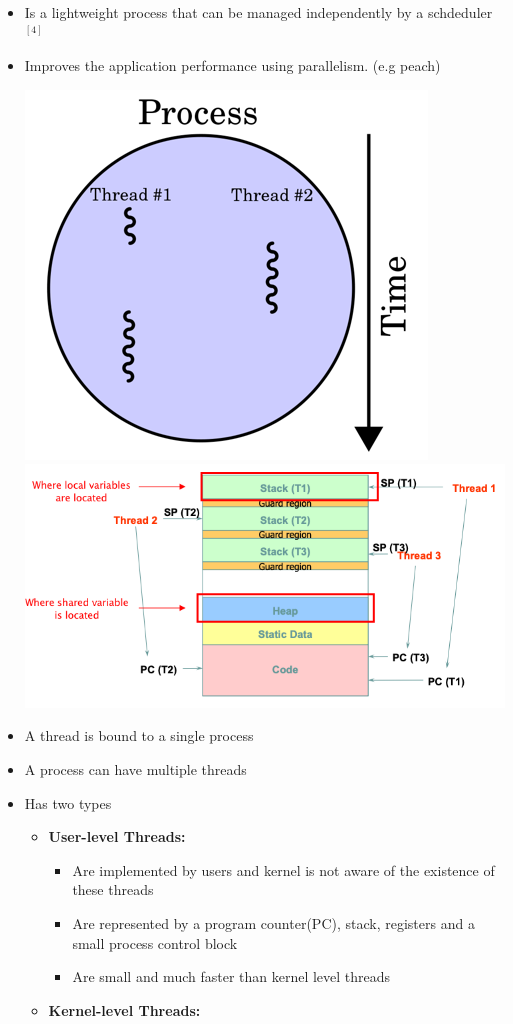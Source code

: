 \documentclass[12pt]{article}
\begin{document}
\begin{itemize}
    \item Is a lightweight process that can be managed independently by a schdeduler $^{[4]}$
    \item Improves the application performance using parallelism. (e.g peach)

    \begin{center}
    \includegraphics[width=0.4\linewidth]{images/midterm_2_solution_1.png}
    \includegraphics[width=\linewidth]{images/midterm_2_solution_2.png}
    \end{center}

    \item A thread is bound to a single process
    \item A process can have multiple threads
    \item Has two types
    \begin{itemize}
        \item \textbf{User-level Threads:}

        \begin{itemize}
            \item Are implemented by users and kernel is not aware of the existence of these threads
            \item Are represented by a program counter(PC), stack, registers and a small process control block
            \item Are small and much faster than kernel level threads
        \end{itemize}
        \item \textbf{Kernel-level Threads:}


\end{itemize}
\end{itemize}
\end{document}
